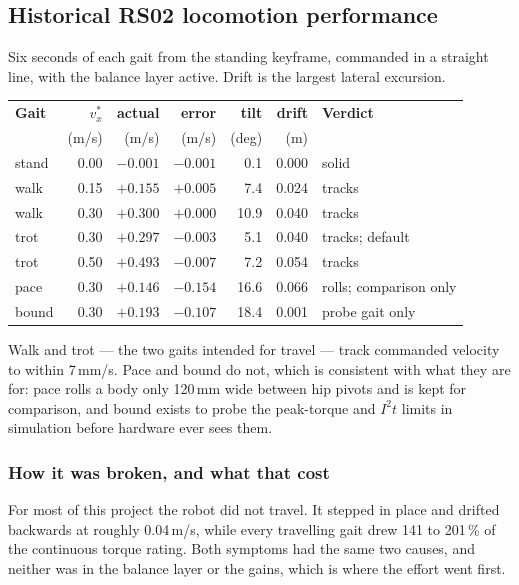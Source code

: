 \documentclass[11pt,a4paper]{article}
\begin{document}
\subsection{Historical RS02 locomotion performance}
\label{sec:locomotion-status}

Six seconds of each gait from the standing keyframe, commanded in a straight
line, with the balance layer active. Drift is the largest lateral excursion.

\begin{center}\small
\begin{tabular}{@{}lrrrrrl@{}}
\toprule
\textbf{Gait} & \textbf{$v^{*}_x$} & \textbf{actual} & \textbf{error} &
\textbf{tilt} & \textbf{drift} & \textbf{Verdict} \\
 & (m/s) & (m/s) & (m/s) & (deg) & (m) & \\
\midrule
stand & 0.00 & $-0.001$ & $-0.001$ &  0.1 & 0.000 & solid \\
walk  & 0.15 & $+0.155$ & $+0.005$ &  7.4 & 0.024 & tracks \\
walk  & 0.30 & $+0.300$ & $+0.000$ & 10.9 & 0.040 & tracks \\
trot  & 0.30 & $+0.297$ & $-0.003$ &  5.1 & 0.040 & tracks; default \\
trot  & 0.50 & $+0.493$ & $-0.007$ &  7.2 & 0.054 & tracks \\
pace  & 0.30 & $+0.146$ & $-0.154$ & 16.6 & 0.066 & rolls; comparison only \\
bound & 0.30 & $+0.193$ & $-0.107$ & 18.4 & 0.001 & probe gait only \\
\bottomrule
\end{tabular}
\end{center}

Walk and trot --- the two gaits intended for travel --- track commanded
velocity to within 7\,mm/s. Pace and bound do not, which is consistent with
what they are for: pace rolls a body only 120\,mm wide between hip
pivots and is kept for comparison, and bound exists to probe the peak-torque
and $I^2t$ limits in simulation before hardware ever sees them.

\subsubsection{How it was broken, and what that cost}

For most of this project the robot did not travel. It stepped in place and
drifted backwards at roughly 0.04\,m/s, while every travelling gait drew 141
to 201\,\% of the continuous torque rating. Both symptoms had the same two
causes, and neither was in the balance layer or the gains, which is where the
effort went first.
\end{document}

